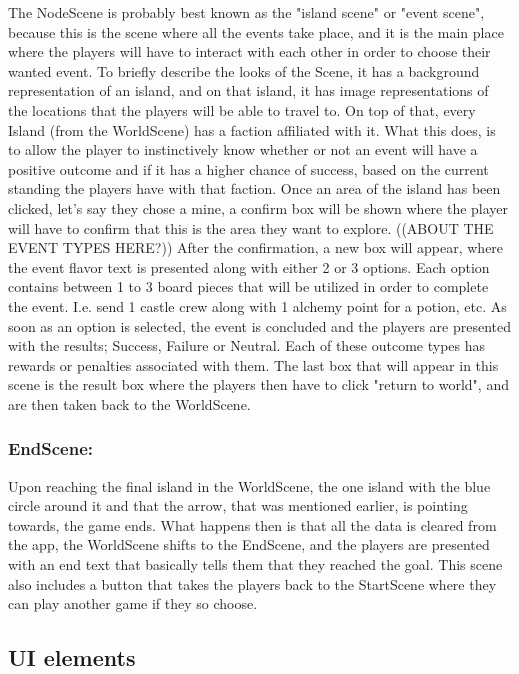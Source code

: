 The NodeScene is probably best known as the "island scene" or "event scene", because 
this is the scene where all the events take place, and it is the main place where the players will have to interact with each other in order to choose their wanted event. 
To briefly describe the looks of the Scene, it has a background representation of an island, and on that island, it has image representations of the locations that the players will be able to travel to. On top of that, every Island (from the WorldScene) has a faction affiliated with it. What this does, is to allow the player to instinctively know whether or not an event will have a positive outcome and if it has a higher chance of success, based on the current standing the players have with that faction.
Once an area of the island has been clicked, let's say they chose a mine, a confirm box will be shown where the player will have to confirm that this is the area they want to explore. ((ABOUT THE EVENT TYPES HERE?))
After the confirmation, a new box will appear, where the event flavor text is presented along with either 2 or 3 options. Each option contains between 1 to 3 board pieces that will be utilized in order to complete the event. I.e. send 1 castle crew along with 1 alchemy point for a potion, etc. As soon as an option is selected, the event is concluded and the players are presented with the results; Success, Failure or Neutral. Each of these outcome types has rewards or penalties associated with them.
The last box that will appear in this scene is the result box where the players then have to click "return to world", and are then taken back to the WorldScene. \\
\subsubsection{EndScene:}

Upon reaching the final island in the WorldScene, the one island with the blue circle around it and that the arrow, that was mentioned earlier, is pointing towards, the game ends. What happens then is that all the data is cleared from the app, the WorldScene shifts to the EndScene, and the players are presented with an end text that basically tells them that they reached the goal. This scene also includes a button that takes the players back to the StartScene where they can play another game if they so choose.



\subsection{UI elements}

